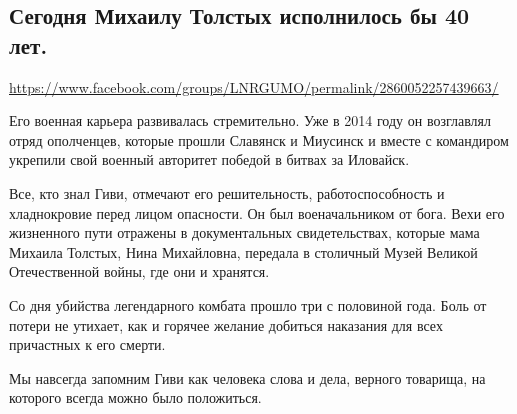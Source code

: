  
 

\subsection{Сегодня Михаилу Толстых исполнилось бы 40 лет.}
\label{sec:19_07_2020.fb.lnr.5}
\url{https://www.facebook.com/groups/LNRGUMO/permalink/2860052257439663/}
  

Его военная карьера развивалась стремительно. Уже в 2014 году он возглавлял
отряд ополченцев, которые прошли Славянск и Миусинск и вместе с командиром
укрепили свой военный авторитет победой в битвах за Иловайск.

Все, кто знал Гиви, отмечают его решительность, работоспособность и
хладнокровие перед лицом опасности. Он был военачальником от бога. Вехи его
жизненного пути отражены в документальных свидетельствах, которые мама Михаила
Толстых, Нина Михайловна, передала в столичный Музей Великой Отечественной
войны, где они и хранятся.

Со дня убийства легендарного комбата прошло три с половиной года. Боль от
потери не утихает, как и горячее желание добиться наказания для всех причастных
к его смерти.

Мы навсегда запомним Гиви как человека слова и дела, верного товарища, на
которого всегда можно было положиться. 
